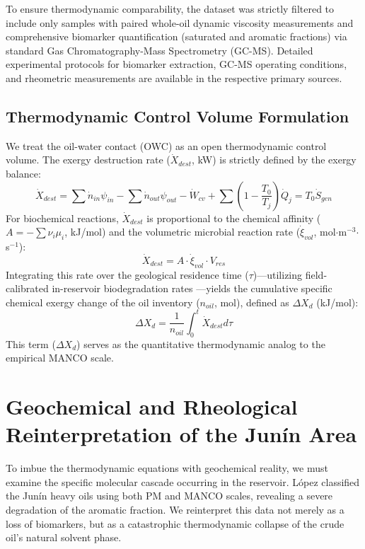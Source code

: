 \documentclass[review,12pt]{elsarticle}
\begin{document}
To ensure thermodynamic comparability, the dataset was strictly filtered to include only samples with paired whole-oil dynamic viscosity measurements and comprehensive biomarker quantification (saturated and aromatic fractions) via standard Gas Chromatography-Mass Spectrometry (GC-MS). Detailed experimental protocols for biomarker extraction, GC-MS operating conditions, and rheometric measurements are available in the respective primary sources.

\subsection{Thermodynamic Control Volume Formulation}
We treat the oil-water contact (OWC) as an open thermodynamic control volume. The exergy destruction rate ($\dot{X}_{dest}$, kW) is strictly defined by the exergy balance:
\begin{equation}
\dot{X}_{dest} = \sum \dot{n}_{in}\psi_{in} - \sum \dot{n}_{out}\psi_{out} - \dot{W}_{cv} + \sum \left(1-\frac{T_0}{T_j}\right)\dot{Q}_j = T_0 \dot{S}_{gen}
\end{equation}
For biochemical reactions, $\dot{X}_{dest}$ is proportional to the chemical affinity ($A = -\sum \nu_i \mu_i$, kJ/mol) and the volumetric microbial reaction rate ($\dot{\xi}_{vol}$, mol$\cdot$m$^{-3}$$\cdot$s$^{-1}$):
\begin{equation}
\dot{X}_{dest} = A \cdot \dot{\xi}_{vol} \cdot V_{res}
\end{equation}
Integrating this rate over the geological residence time ($\tau$)---utilizing field-calibrated in-reservoir biodegradation rates \cite{larter2003}---yields the cumulative specific chemical exergy change of the oil inventory ($n_{oil}$, mol), defined as $\Delta X_d$ (kJ/mol):
\begin{equation}
\Delta X_d = \frac{1}{n_{oil}} \int_{0}^{t} \dot{X}_{dest} d\tau
\end{equation}
This term ($\Delta X_d$) serves as the quantitative thermodynamic analog to the empirical MANCO scale.

\section{Geochemical and Rheological Reinterpretation of the Jun\'in Area}

To imbue the thermodynamic equations with geochemical reality, we must examine the specific molecular cascade occurring in the reservoir. L\'opez \cite{lopez2014} classified the Jun\'in heavy oils using both PM and MANCO scales, revealing a severe degradation of the aromatic fraction. We reinterpret this data not merely as a loss of biomarkers, but as a catastrophic thermodynamic collapse of the crude oil's natural solvent phase.
\end{document}
